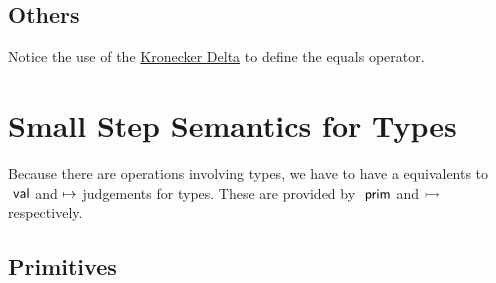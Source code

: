 \documentclass{article}
\begin{document}
\subsection{Others}
Notice the use of the \href{https://en.wikipedia.org/wiki/Kronecker_delta}{Kronecker Delta} to define the equals operator.
{
    \centering
    \def \MathparLineskip {\lineskip=0.43cm}
}

\section{Small Step Semantics for Types}
Because there are operations involving types, we have to have a equivalents to $~\mathsf{val}$ and $\mapsto$ judgements for types. These are provided by $~\mathsf{prim}$ and $\rightarrowtail$ respectively.

\subsection{Primitives}
{
    \centering
    \def \MathparLineskip {\lineskip=0.43cm}
}
\end{document}
